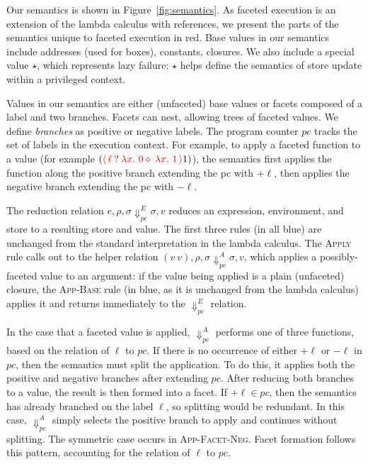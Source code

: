 \documentclass[review=true,acmlarge]{acmart}
\newcommand{\colorMATH}{black!20!blue}
\newcommand{\colorFAC}{black!20!red}
\newcommand{\fcol}[1] {{\color{\colorFAC} #1}}
\newcommand{\bmth}[1] {{\color{\colorMATH} $#1$}}
\newcommand{\rmth}[1] {{\color{\colorFAC} $#1$}}
\newcommand{\facet}[3]{{\fcol{\ensuremath{\langle \, {#1} \: ? \: {#2} \diamond \: {#3} \, \rangle}}}}
\begin{document}
Our semantics is shown in Figure~\ref{fig:semantics}. As faceted
execution is an extension of the lambda calculus with references, we
present the parts of the semantics unique to faceted execution in
red. Base values in our semantics include addresses (used for boxes),
constants, closures. We also include a special value \bmth{\star},
which represents lazy failure: \bmth{\star} helps define the semantics
of store update within a privileged context.

Values in our semantics are either (unfaceted) base values or facets
composed of a label and two branches. Facets can nest, allowing trees
of faceted values. We define \emph{branches} as positive or negative
labels. The program counter \rmth{pc} tracks the set of labels in the
execution context. For example, to apply a faceted function to a value
(for example \bmth{(\facet{\ell}{\lambda x.~0}{\lambda x.~1} 1)}), the
semantics first applies the function along the positive branch
extending the pc with \bmth{+\ell}, then applies the negative branch
extending the pc with \bmth{-\ell}.

The reduction relation \bmth{e, \rho, \sigma \Downarrow_{pc}^E \sigma,
  v} reduces an expression, environment, and store to a resulting
store and value. The first three rules (in all blue) are unchanged
from the standard interpretation in the lambda calculus. The
\textsc{Apply} rule calls out to the helper relation \rmth{(v~v),
  \rho, \sigma \Downarrow_{pc}^A \sigma, v}, which applies a
possibly-faceted value to an argument: if the value being applied is a
plain (unfaceted) closure, the \textsc{App-Base} rule (in blue, as it
is unchanged from the lambda calculus) applies it and returns
immediately to the \bmth{\Downarrow_{pc}^E} relation.

In the case that a faceted value is applied, \rmth{\Downarrow_{pc}^A}
performs one of three functions, based on the relation of \rmth{\ell}
to \rmth{pc}. If there is no occurrence of either \rmth{+\ell} or
\rmth{-\ell} in \rmth{pc}, then the semantics must split the
application. To do this, it applies both the positive and negative
branches after extending \rmth{pc}. After reducing both branches to a
value, the result is then formed into a facet. If \rmth{+\ell \in pc},
then the semantics has already branched on the label \rmth{\ell}, so
splitting would be redundant. In this case, \rmth{\Downarrow_{pc}^A}
simply selects the positive branch to apply and continues without
splitting. The symmetric case occurs in \textsc{App-Facet-Neg}. Facet
formation follows this pattern, accounting for the relation of
\rmth{\ell} to \rmth{pc}.
\end{document}
